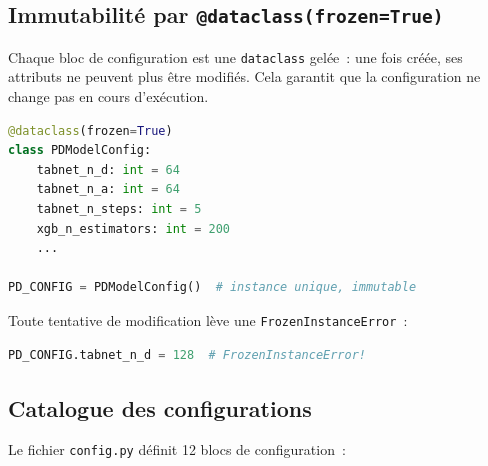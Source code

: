 \documentclass[12pt,a4paper]{article}
\begin{document}
\subsection{Immutabilit\'e par \texttt{@dataclass(frozen=True)}}

Chaque bloc de configuration est une \texttt{dataclass} gel\'ee~: une fois cr\'e\'ee, ses attributs ne peuvent plus \^etre modifi\'es. Cela garantit que la configuration ne change pas en cours d'ex\'ecution.

\begin{formulebox}
\begin{lstlisting}[language=Python]
@dataclass(frozen=True)
class PDModelConfig:
    tabnet_n_d: int = 64
    tabnet_n_a: int = 64
    tabnet_n_steps: int = 5
    xgb_n_estimators: int = 200
    ...

PD_CONFIG = PDModelConfig()  # instance unique, immutable
\end{lstlisting}
Toute tentative de modification l\`eve une \texttt{FrozenInstanceError}~:
\begin{lstlisting}[language=Python]
PD_CONFIG.tabnet_n_d = 128  # FrozenInstanceError!
\end{lstlisting}
\end{formulebox}

\subsection{Catalogue des configurations}

Le fichier \texttt{config.py} d\'efinit 12 blocs de configuration~:
\end{document}
